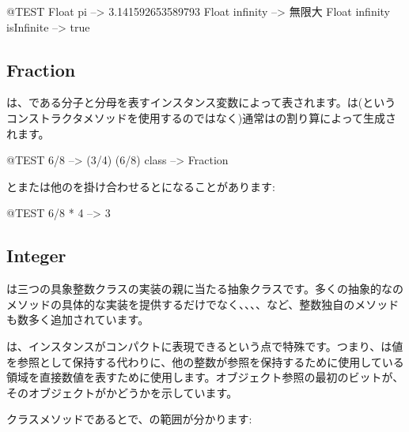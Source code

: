 \documentclass[a4paper,10pt,twoside]{book}
\begin{document}
\begin{code}{@TEST}
Float pi                      --> 3.141592653589793
Float infinity               --> 無限大
Float infinity isInfinite --> true
\end{code}

\subsection{Fraction}

は、である分子と分母を表すインスタンス変数によって表されます。は(というコンストラクタメソッドを使用するのではなく)通常はの割り算によって生成されます。

\begin{code}{@TEST}
6/8             --> (3/4)
(6/8) class --> Fraction
\end{code}

とまたは他のを掛け合わせるとになることがあります:

\begin{code}{@TEST}
6/8 * 4 --> 3
\end{code}


\subsection{Integer}

は三つの具象整数クラスの実装の親に当たる抽象クラスです。多くの抽象的なのメソッドの具体的な実装を提供するだけでなく、、、、など、整数独自のメソッドも数多く追加されています。

は、インスタンスがコンパクトに表現できるという点で特殊です。つまり、は値を参照として保持する代わりに、他の整数が参照を保持するために使用している領域を直接数値を表すために使用します。オブジェクト参照の最初のビットが、そのオブジェクトがかどうかを示しています。

クラスメソッドであるとで、の範囲が分かります:
\end{document}

